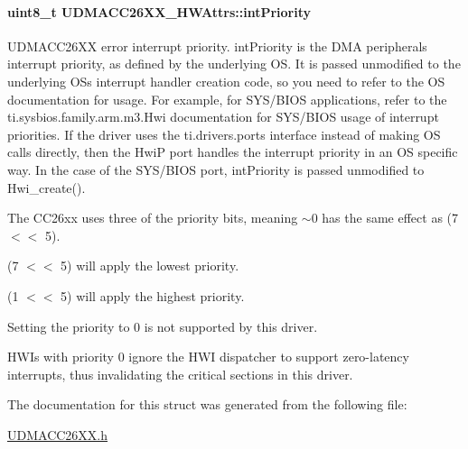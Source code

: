 \paragraph[{int\+Priority}]{\setlength{\rightskip}{0pt plus 5cm}uint8\+\_\+t U\+D\+M\+A\+C\+C26\+X\+X\+\_\+\+H\+W\+Attrs\+::int\+Priority}\label{struct_u_d_m_a_c_c26_x_x___h_w_attrs_a56b5f00f14e051a08329130b6d2c6fe6}


U\+D\+M\+A\+C\+C26\+X\+X error interrupt priority. int\+Priority is the D\+M\+A peripheral\textquotesingle{}s interrupt priority, as defined by the underlying O\+S. It is passed unmodified to the underlying O\+S\textquotesingle{}s interrupt handler creation code, so you need to refer to the O\+S documentation for usage. For example, for S\+Y\+S/\+B\+I\+O\+S applications, refer to the ti.\+sysbios.\+family.\+arm.\+m3.\+Hwi documentation for S\+Y\+S/\+B\+I\+O\+S usage of interrupt priorities. If the driver uses the ti.\+drivers.\+ports interface instead of making O\+S calls directly, then the Hwi\+P port handles the interrupt priority in an O\+S specific way. In the case of the S\+Y\+S/\+B\+I\+O\+S port, int\+Priority is passed unmodified to Hwi\+\_\+create(). 

The C\+C26xx uses three of the priority bits, meaning $\sim$0 has the same effect as (7 $<$$<$ 5).

(7 $<$$<$ 5) will apply the lowest priority.

(1 $<$$<$ 5) will apply the highest priority.

Setting the priority to 0 is not supported by this driver.

H\+W\+I\textquotesingle{}s with priority 0 ignore the H\+W\+I dispatcher to support zero-\/latency interrupts, thus invalidating the critical sections in this driver. 

The documentation for this struct was generated from the following file\+:\begin{DoxyCompactItemize}
\item 
\hyperlink{_u_d_m_a_c_c26_x_x_8h}{U\+D\+M\+A\+C\+C26\+X\+X.\+h}\end{DoxyCompactItemize}
